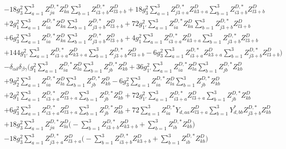 \begin{align}
 &-18 g_{3}^{2} \sum_{a=1}^{3}Z^{D,*}_{j a} Z_{{k a}}^{D}  \sum_{b=1}^{3}Z^{D,*}_{i 3 + b} Z_{{l 3 + b}}^{D}  +18 g_{3}^{2} \sum_{a=1}^{3}Z^{D,*}_{j 3 + a} Z_{{k 3 + a}}^{D}  \sum_{b=1}^{3}Z^{D,*}_{i 3 + b} Z_{{l 3 + b}}^{D}  \nonumber \\ 
 &+2 g_{1}^{2} \sum_{a=1}^{3}Z^{D,*}_{i a} Z_{{k a}}^{D}  \sum_{b=1}^{3}Z^{D,*}_{j 3 + b} Z_{{l 3 + b}}^{D}  +72 g_{1'}^{2} \sum_{a=1}^{3}Z^{D,*}_{i a} Z_{{k a}}^{D}  \sum_{b=1}^{3}Z^{D,*}_{j 3 + b} Z_{{l 3 + b}}^{D}  \nonumber \\ 
 &+6 g_{3}^{2} \sum_{a=1}^{3}Z^{D,*}_{i a} Z_{{k a}}^{D}  \sum_{b=1}^{3}Z^{D,*}_{j 3 + b} Z_{{l 3 + b}}^{D}  +4 g_{1}^{2} \sum_{a=1}^{3}Z^{D,*}_{i 3 + a} Z_{{k 3 + a}}^{D}  \sum_{b=1}^{3}Z^{D,*}_{j 3 + b} Z_{{l 3 + b}}^{D}  \nonumber \\ 
 &+144 g_{1'}^{2} \sum_{a=1}^{3}Z^{D,*}_{i 3 + a} Z_{{k 3 + a}}^{D}  \sum_{b=1}^{3}Z^{D,*}_{j 3 + b} Z_{{l 3 + b}}^{D}  -6 g_{3}^{2} \sum_{a=1}^{3}Z^{D,*}_{i 3 + a} Z_{{k 3 + a}}^{D}  \sum_{b=1}^{3}Z^{D,*}_{j 3 + b} Z_{{l 3 + b}}^{D}  \Big)\nonumber \\ 
 &- \delta_{\alpha \delta} \delta_{\beta \gamma} \Big(g_{1}^{2} \sum_{a=1}^{3}Z^{D,*}_{i a} Z_{{l a}}^{D}  \sum_{b=1}^{3}Z^{D,*}_{j b} Z_{{k b}}^{D}  +36 g_{1'}^{2} \sum_{a=1}^{3}Z^{D,*}_{i a} Z_{{l a}}^{D}  \sum_{b=1}^{3}Z^{D,*}_{j b} Z_{{k b}}^{D}  \nonumber \\ 
 &+9 g_{2}^{2} \sum_{a=1}^{3}Z^{D,*}_{i a} Z_{{l a}}^{D}  \sum_{b=1}^{3}Z^{D,*}_{j b} Z_{{k b}}^{D}  -6 g_{3}^{2} \sum_{a=1}^{3}Z^{D,*}_{i a} Z_{{l a}}^{D}  \sum_{b=1}^{3}Z^{D,*}_{j b} Z_{{k b}}^{D}  \nonumber \\ 
 &+2 g_{1}^{2} \sum_{a=1}^{3}Z^{D,*}_{i 3 + a} Z_{{l 3 + a}}^{D}  \sum_{b=1}^{3}Z^{D,*}_{j b} Z_{{k b}}^{D}  +72 g_{1'}^{2} \sum_{a=1}^{3}Z^{D,*}_{i 3 + a} Z_{{l 3 + a}}^{D}  \sum_{b=1}^{3}Z^{D,*}_{j b} Z_{{k b}}^{D}  \nonumber \\ 
 &+6 g_{3}^{2} \sum_{a=1}^{3}Z^{D,*}_{i 3 + a} Z_{{l 3 + a}}^{D}  \sum_{b=1}^{3}Z^{D,*}_{j b} Z_{{k b}}^{D}  +72 \sum_{a=1}^{3}Z^{D,*}_{i a} Y_{d,{a a}} Z_{{l 3 + a}}^{D}  \sum_{b=1}^{3}Y^*_{d,{b b}} Z^{D,*}_{j 3 + b} Z_{{k b}}^{D}  \nonumber \\ 
 &+18 g_{3}^{2} \sum_{a=1}^{3}Z^{D,*}_{j a} Z_{{l a}}^{D}  \Big(- \sum_{b=1}^{3}Z^{D,*}_{i 3 + b} Z_{{k 3 + b}}^{D}   + \sum_{b=1}^{3}Z^{D,*}_{i b} Z_{{k b}}^{D} \Big)\nonumber \\ 
 &-18 g_{3}^{2} \sum_{a=1}^{3}Z^{D,*}_{j 3 + a} Z_{{l 3 + a}}^{D}  \Big(- \sum_{b=1}^{3}Z^{D,*}_{i 3 + b} Z_{{k 3 + b}}^{D}   + \sum_{b=1}^{3}Z^{D,*}_{i b} Z_{{k b}}^{D} \Big)\nonumber \\ 

\end{align}
